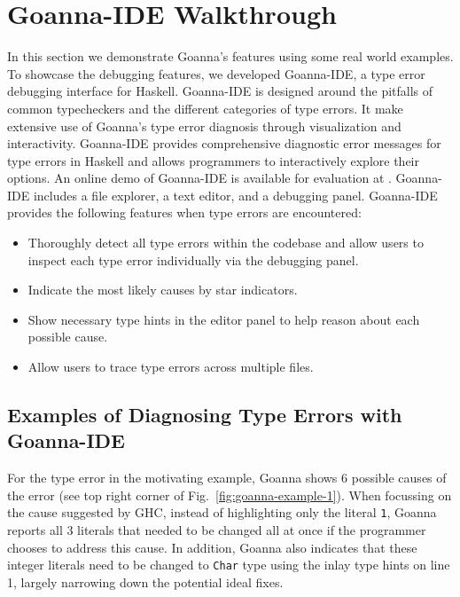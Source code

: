 \documentclass[pdflatex,sn-mathphys-num]{sn-jnl}%
\begin{document}
\section{Goanna-IDE Walkthrough} \label{walkthrough}
In this section we  demonstrate Goanna's features using some real world examples. To showcase the debugging features,  we developed Goanna-IDE, a type error debugging interface for Haskell. Goanna-IDE is designed around the pitfalls of common typecheckers and the different categories of type errors. It make extensive use of Goanna's type error diagnosis through visualization and interactivity. Goanna-IDE provides comprehensive diagnostic error messages for type errors in Haskell and allows programmers to interactively explore their options. An online demo of Goanna-IDE is available for evaluation at \cite{Fu2023-bo}. Goanna-IDE includes a file explorer, a text editor, and a debugging panel. Goanna-IDE provides the following features when type errors are encountered:

    \begin{itemize}
        \item Thoroughly detect all type errors within the codebase and allow users to inspect each type error individually via the debugging panel.
        \item Indicate the most likely causes by star indicators.
        \item Show necessary type hints in the editor panel to help reason about each possible cause.
        \item Allow users to trace type errors across multiple files.
    \end{itemize}

    \subsection{Examples of Diagnosing Type Errors with Goanna-IDE}

    For the type error in the motivating example, Goanna shows 6 possible causes of the error (see top right corner of Fig.~\ref{fig:goanna-example-1}). When focussing on the cause suggested by GHC, instead of highlighting only the literal \texttt{1}, Goanna reports all 3 literals that needed to be changed all at once if the programmer chooses to address this cause. In addition, Goanna also indicates that these integer literals need to be changed to \texttt{Char} type using the inlay type hints on line 1, largely narrowing down the potential ideal fixes. 
    
\end{document}
